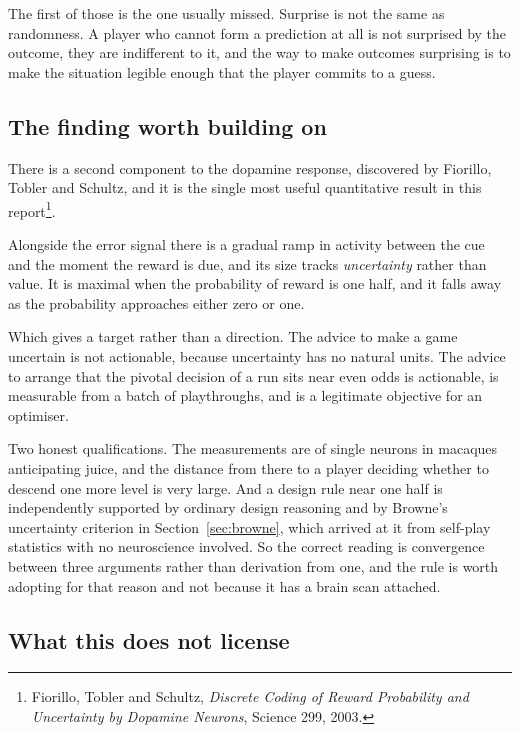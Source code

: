 \documentclass[11pt,a4paper]{article}
\begin{document}
The first of those is the one usually missed. Surprise is not the same as randomness. A player
who cannot form a prediction at all is not surprised by the outcome, they are indifferent to it,
and the way to make outcomes surprising is to make the situation legible enough that the player
commits to a guess.

\subsection{The finding worth building on}

There is a second component to the dopamine response, discovered by Fiorillo, Tobler and
Schultz, and it is the single most useful quantitative result in this
report\footnote{Fiorillo, Tobler and Schultz, \emph{Discrete Coding of Reward Probability and
Uncertainty by Dopamine Neurons}, Science 299, 2003.}.

Alongside the error signal there is a gradual ramp in activity between the cue and the moment the
reward is due, and its size tracks \emph{uncertainty} rather than value. It is maximal when the
probability of reward is one half, and it falls away as the probability approaches either zero or
one.

\begin{sectionbox}
Which gives a target rather than a direction. The advice to make a game uncertain is not
actionable, because uncertainty has no natural units. The advice to arrange that the pivotal
decision of a run sits near even odds is actionable, is measurable from a batch of playthroughs,
and is a legitimate objective for an optimiser.
\end{sectionbox}

Two honest qualifications. The measurements are of single neurons in macaques anticipating juice,
and the distance from there to a player deciding whether to descend one more level is very
large. And a design rule near one half is independently supported by ordinary design reasoning
and by Browne's uncertainty criterion in Section~\ref{sec:browne}, which arrived at it from
self-play statistics with no neuroscience involved. So the correct reading is convergence
between three arguments rather than derivation from one, and the rule is worth adopting for that
reason and not because it has a brain scan attached.

\subsection{What this does not license}
\label{sec:notlicensed}
\end{document}
